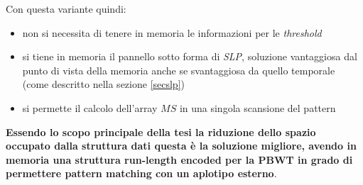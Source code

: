 Con questa variante quindi:
\begin{itemize}
  \item non si necessita di tenere in memoria le informazioni per le
  \textit{threshold}
  \item si tiene in memoria il pannello sotto forma di \textit{SLP}, soluzione
  vantaggiosa dal punto di vista della memoria anche se svantaggiosa da quello
  temporale (come descritto nella sezione \ref{secslp})
  \item si permette il calcolo dell'array $MS$ in una singola scansione del
  pattern 
\end{itemize}
\textbf{Essendo lo scopo principale della tesi la riduzione dello spazio
  occupato dalla struttura dati questa è la soluzione migliore, avendo in
  memoria una struttura run-length encoded per la PBWT in grado di permettere
  pattern matching con un aplotipo esterno}.
